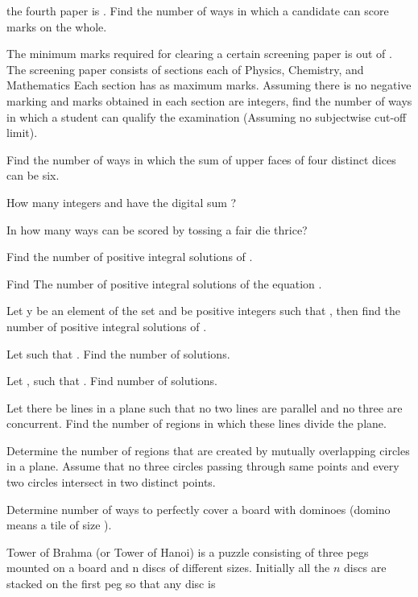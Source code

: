   the fourth paper is . Find the number of ways in which a candidate can score  marks on the
  whole.
\item The minimum marks required for clearing a certain screening paper is  out of . The
  screening paper consists of  sections each of Physics, Chemistry, and Mathematics Each section has
   as maximum marks. Assuming there is no negative marking and marks obtained in each section are
  integers, find the number of ways in which a student can qualify the examination (Assuming no subjectwise
  cut-off limit).
\item Find the number of ways in which the sum of upper faces of four distinct dices can be six.
\item How many integers  and  have the digital sum ?
\item In how many ways can  be scored by tossing a fair die thrice?
\item Find the number of positive integral solutions of .
\item Find The number of positive integral solutions of the equation .
\item Let y be an element of the set  and  be positive
  integers such that , then find the number of positive integral solutions of .
\item Let  such that . Find the number of
  solutions.
\item Let , such that . Find number of
  solutions.
\item Let there be  lines in a plane such that no two lines are parallel and no three are
  concurrent. Find the number of regions in which these lines divide the plane.
\item Determine the number of regions that are created by  mutually overlapping circles in a
  plane. Assume that no three circles passing through same points and every two circles intersect in two
  distinct points.
\item Determine number of ways to perfectly cover a  board with dominoes (domino means a tile
  of size ).
\item Tower of Brahma (or Tower of Hanoi) is a puzzle consisting of three pegs mounted on a board and n
  discs of different sizes. Initially all the $n$ discs are stacked on the first peg so that any disc is
